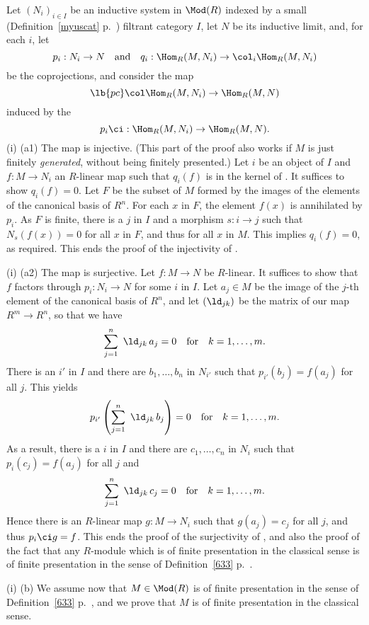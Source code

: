 \documentclass[12pt]{article}
\theoremstyle{remark}
\theoremstyle{definition}
\begin{document}
Let $(N_i)_{i\in I}$ be an inductive system in $\Mod(R)$ indexed by a small (Definition~\ref{myuscat} p.~) filtrant category $I$, let $N$ be its inductive limit, and, for each $i$, let %
$$
p_i:N_i\to N\quad\text{and}\quad q_i:\Hom_R(M,N_i)\to\col_i\Hom_R(M,N_i)
$$ 
be the coprojections, and consider the map
\begin{equation}\lb{pc}
\col\Hom_R(M,N_i)\to\Hom_R(M,N)
\end{equation}  
induced by the 
$$
p_i\ci:\Hom_R(M,N_i)\to\Hom_R(M,N).
$$ 
(i) (a1) The map  is injective. (This part of the proof also works if $M$ is just finitely \emph{generated}, without being finitely presented.) Let $i$ be an object of $I$ and $f:M\to N_i$ an $R$-linear map such that $q_i(f)$ is in the kernel of . It suffices to show $q_i(f)=0$. Let $F$ be the subset of $M$ formed by the images of the elements of the canonical basis of $R^n$. For each $x$ in $F$, the element $f(x)$ is annihilated by $p_i$. As $F$ is finite, there is a $j$ in $I$ and a morphism $s:i\to j$ such that $N_s(f(x))=0$ for all $x$ in $F$, and thus for all $x$ in $M$. This implies $q_i(f)=0$, as required. This ends the proof of the injectivity of .

\nn(i) (a2) The map  is surjective. Let $f:M\to N$ be $R$-linear. It suffices to show that $f$ factors through $p_i:N_i\to N$ for some $i$ in $I$. Let $a_j\in M$ be the image of the $j$-th element of the canonical basis of $R^n$, and let $(\ld_{jk})$ be the matrix of our map $R^m\to R^n$, so that we have 
$$
\sum_{j=1}^n\ \ld_{jk}\,a_j=0\quad\text{for}\quad k=1,\dots,m.
$$ 
There is an $i'$ in $I$ and there are $b_1,\dots,b_n$ in $N_{i'}$ such that $p_{i'}(b_j)=f(a_j)$ for all $j$. This yields 
$$
p_{i'}\left(\sum_{j=1}^n\ \ld_{jk}\,b_j\right)=0\quad\text{for}\quad k=1,\dots,m.
$$ 
As a result, there is a $i$ in $I$ and there are $c_1,\dots,c_n$ in $N_i$ such that $p_i(c_j)=f(a_j)$ for all $j$ and 
$$
\sum_{j=1}^n\ \ld_{jk}\,c_j=0\quad\text{for}\quad k=1,\dots,m.
$$ 
Hence there is an $R$-linear map $g:M\to N_i$ such that $g(a_j)=c_j$ for all $j$, and thus $p_i\ci g=f$. This ends the proof of the surjectivity of , and also the proof of the fact that any $R$-module which is of finite presentation in the classical sense is of finite presentation in the sense of Definition~\ref{633} p.~. 

\nn(i) (b) We assume now that $M\in\Mod(R)$ is of finite presentation in the sense of Definition~\ref{633} p.~, and we prove that $M$ is of finite presentation in the classical sense.
\end{document}
